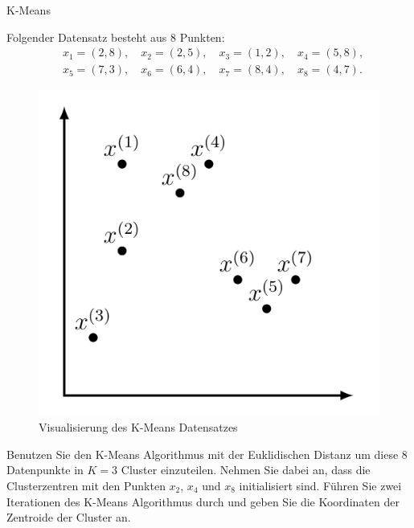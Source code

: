 \begin{task}[credit=6]{K-Means}

Folgender Datensatz besteht aus $8$ Punkten:
\begin{equation}
 \begin{aligned}
&x_1=(2,8), \quad x_2=(2,5),\quad x_3=(1,2), \quad x_4=(5,8),\\
&x_5=(7,3), \quad x_6=(6,4),\quad x_7=(8,4), \quad x_8=(4,7).
 \end{aligned}
\end{equation}

\begin{figure}[h!]
\centering
\includegraphics[width=0.4\linewidth]{media/images/kmeans.png}
\caption{Visualisierung des K-Means Datensatzes}
\end{figure}

\begin{subtask}[points=6,title={K-Means Algorithmus}]
Benutzen Sie den K-Means Algorithmus mit der Euklidischen Distanz um diese $8$ Datenpunkte in $K=3$ Cluster einzuteilen.
Nehmen Sie dabei an, dass die Clusterzentren mit den Punkten $x_2$, $x_4$ und $x_8$ initialisiert sind.
Führen Sie zwei Iterationen des K-Means Algorithmus durch und geben Sie die Koordinaten der Zentroide der Cluster an.


\end{subtask}
\end{task}
